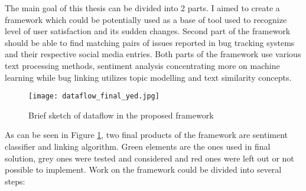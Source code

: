The main goal of this thesis can be divided into 2 parts. I aimed to create a framework which could be potentially used as a base of tool used to recognize level of user satisfaction and its sudden changes. Second part of the framework should be able to find matching pairs of issues reported in bug tracking systems and their respective social media entries. Both parts of the framework use various text processing methods, sentiment analysis concentrating more on machine learning while bug linking utilizes topic modelling and text similarity concepts.\\
\begin{figure}%
    \centering
	\texttt{[image: dataflow\_final\_yed.jpg]}
    \caption{Brief sketch of dataflow in the proposed framework}%
    \label{fig:frameworkDataflow}%
\end{figure}
As can be seen in Figure \ref{fig:frameworkDataflow}, two final products of the framework are sentiment classifier and linking algorithm. Green elements are the ones used in final solution, grey ones were tested and considered and red ones were left out or not possible to implement. Work on the framework could be divided into several steps:
